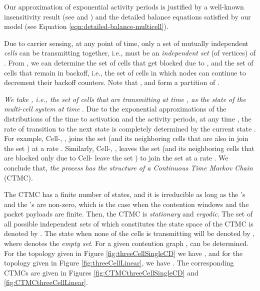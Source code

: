 \documentclass[10pt,a4paper,journal]{IEEEtran}
\theoremstyle{definition}
\theoremstyle{remark}
\theoremstyle{plain}
\begin{document}
Our approximation of exponential activity periods is justified by a well-known insensitivity result (see \cite[Theorem 1]{queueing.whittle85partial-balance-insensitivity} and \cite{wanet.boorstyn87multihop}) and the detailed balance equations satisfied by our model (see Equation \eqref{eqn:detailed-balance-multicell}). 

Due to carrier sensing, at any point of time, only a set  of mutually independent \textit{cells} can be transmitting together, i.e.,  must be an \textit{independent set} (of vertices) of . From , we can determine the set of cells  that get blocked due to , and the set of cells  that remain in backoff, i.e., the set of cells in which nodes can continue to decrement their backoff counters. Note that ,  and  form a partition of . 

\textit{We take , i.e., the set  of cells that are transmitting at time , as the state of the multi-cell system at time }. Due to the exponential approximations of the distributions of the time to activation and the activity periods, at any time , the rate of transition to the next state is completely determined by the current state . For example, Cell-, , joins the set  (and its neighboring cells that are also in  join the set ) at a rate . Similarly, Cell-, , leaves the set  (and its neighboring cells that are blocked only due to Cell- leave the set ) to join the set  at a rate . We conclude that, \textit{the process  has the structure of a Continuous Time Markov Chain} (CTMC). 

The CTMC  has a finite number of states, and it is irreducible as long as the 's and the 's are non-zero, which is the case when the contention windows and the packet payloads are finite. Then, the CTMC  is \textit{stationary} and \textit{ergodic}. The set of all possible independent sets of  which constitutes the state space of the CTMC  is denoted by . The state when none of the cells is transmitting will be denoted by , where  denotes the \textit{empty set}. For a given contention graph ,  can be determined. For the topology given in Figure \ref{fig:threeCellSingleCD} we have , and for the topology given in Figure \ref{fig:threeCellLinear}, we have . The corresponding CTMCs are given in Figures \ref{fig:CTMCthreeCellSingleCD} and \ref{fig:CTMCthreeCellLinear}.
\end{document}
